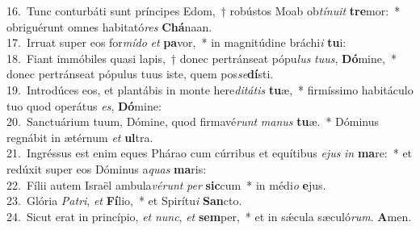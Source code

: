 {16.~}Tunc conturbáti sunt príncipes Edom,~† robústos Moab ob\textit{tí}\textit{nu}\textit{it} \textbf{tre}mor:~* obriguérunt omnes habitató\textit{res} \textbf{Chá}naan.\\
{17.~}Irruat super eos for\textit{mí}\textit{do} \textit{et} \textbf{pa}vor,~* in magnitúdine bráchi\textit{i} \textbf{tu}i:\\
{18.~}Fiant immóbiles quasi lapis,~† donec pertránseat pópu\textit{lus} \textit{tu}\textit{us}, \textbf{Dó}mine,~* donec pertránseat pópulus tuus iste, quem pos\textit{se}\textbf{dí}sti.\\
{19.~}Introdúces eos, et plantábis in monte here\textit{di}\textit{tá}\textit{tis} \textbf{tu}æ,~* firmíssimo habitáculo tuo quod operátus \textit{es}, \textbf{Dó}mine:\\
{20.~}Sanctuárium tuum, Dómine, quod firmavé\textit{runt} \textit{ma}\textit{nus} \textbf{tu}æ.~* Dóminus regnábit in ætérnum \textit{et} \textbf{ul}tra.\\
{21.~}Ingréssus est enim eques Phárao cum cúrribus et equítibus \textit{e}\textit{jus} \textit{in} \textbf{ma}re:~* et redúxit super eos Dóminus a\textit{quas} \textbf{ma}ris:\\
{22.~}Fílii autem Israël ambula\textit{vé}\textit{runt} \textit{per} \textbf{sic}cum~* in médi\textit{o} \textbf{e}jus.\\
{23.~}Glória \textit{Pa}\textit{tri}, \textit{et} \textbf{Fí}lio,~* et Spirítu\textit{i} \textbf{San}cto.\\
{24.~}Sicut erat in princípio, \textit{et} \textit{nunc}, \textit{et} \textbf{sem}per,~* et in sǽcula sæculó\textit{rum}. \textbf{A}men.\\
